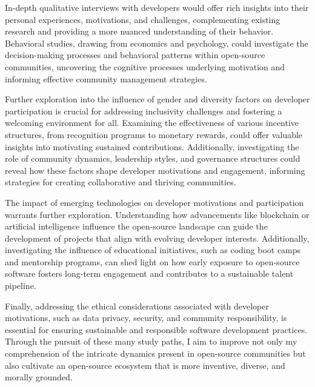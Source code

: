 In-depth qualitative interviews with developers would offer rich insights into their personal experiences, motivations, and challenges, complementing existing research and providing a more nuanced understanding of their behavior.  Behavioral studies, drawing from economics and psychology, could investigate the decision-making processes and behavioral patterns within open-source communities, uncovering the cognitive processes underlying motivation and informing effective community management strategies.

Further exploration into the influence of gender and diversity factors on developer participation is crucial for addressing inclusivity challenges and fostering a welcoming environment for all. Examining the effectiveness of various incentive structures, from recognition programs to monetary rewards, could offer valuable insights into motivating sustained contributions. Additionally, investigating the role of community dynamics, leadership styles, and governance structures could reveal how these factors shape developer motivations and engagement, informing strategies for creating collaborative and thriving communities.

The impact of emerging technologies on developer motivations and participation warrants further exploration. Understanding how advancements like blockchain or artificial intelligence influence the open-source landscape can guide the development of projects that align with evolving developer interests.  Additionally, investigating the influence of educational initiatives, such as coding boot camps and mentorship programs, can shed light on how early exposure to open-source software fosters long-term engagement and contributes to a sustainable talent pipeline.

Finally, addressing the ethical considerations associated with developer motivations, such as data privacy, security, and community responsibility, is essential for ensuring sustainable and responsible software development practices. Through the pursuit of these many study paths, I aim to improve not only my comprehension of the intricate dynamics present in open-source communities but also cultivate an open-source ecosystem that is more inventive, diverse, and morally grounded.